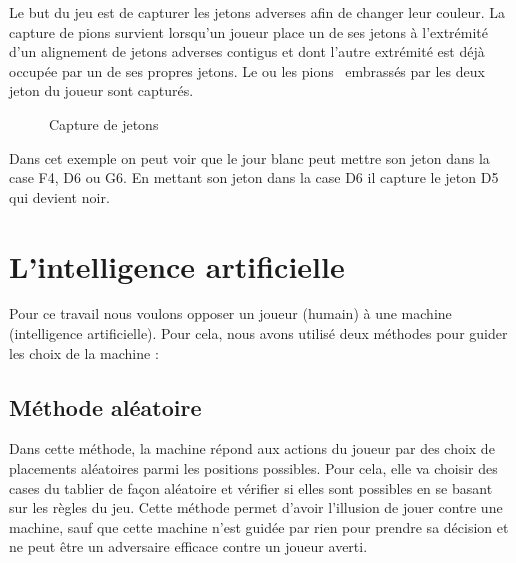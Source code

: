 \documentclass[11pt]{article}
\begin{document}
Le but du jeu est de capturer les jetons adverses afin de changer leur
couleur. La capture de pions survient lorsqu'un joueur place un de ses jetons
à l'extrémité d'un alignement de jetons adverses contigus et dont
l'autre extrémité est déjà occupée par un de ses propres
jetons. Le ou les pions \ embrassés par les deux jeton du joueur sont
capturés.


\begin{figure}[h]
  \caption {Capture de jetons}
  \noindent{}
\end{figure}

Dans cet exemple on peut voir que le jour blanc peut mettre son jeton dans la
case F4, D6 ou G6. En mettant son jeton dans la case D6 il capture le jeton D5
qui devient noir.

\section{L'intelligence artificielle}

Pour ce travail nous voulons opposer un joueur (humain) à une machine
(intelligence artificielle). Pour cela, nous avons utilisé deux
méthodes pour guider les choix de la machine :

\subsection{Méthode aléatoire}

Dans cette méthode, la machine répond aux actions du joueur par des
choix de placements aléatoires parmi les positions possibles. Pour cela,
elle va choisir des cases du tablier de fa{\c c}on aléatoire et
vérifier si elles sont possibles en se basant sur les règles du jeu.
Cette méthode permet d'avoir l'illusion de jouer contre une machine, sauf
que cette machine n'est guidée par rien pour prendre sa décision et ne
peut être un adversaire efficace contre un joueur averti.
\end{document}
